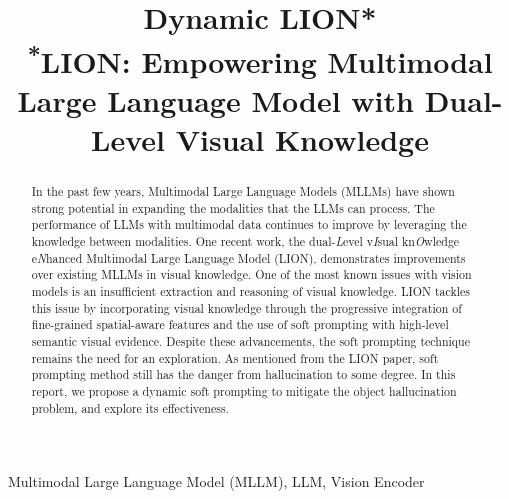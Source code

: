 \documentclass[conference]{IEEEtran}
\begin{document}
\title{Dynamic LION*\\
{\footnotesize \textsuperscript{*}LION: Empowering Multimodal Large Language Model with Dual-Level Visual Knowledge}
}

\author{
  \and
} 

\maketitle

\begin{abstract}
In the past few years, Multimodal Large Language Models (MLLMs) have shown strong potential in expanding the modalities that the LLMs can process.
The performance of LLMs with multimodal data continues to improve by leveraging the knowledge between modalities.
One recent work, the dual-\textit{L}evel v\textit{I}sual kn\textit{O}wledge e\textit{N}hanced Multimodal Large Language Model (LION), demonstrates improvements over existing MLLMs in visual knowledge.
One of the most known issues with vision models is an insufficient extraction and reasoning of visual knowledge.
LION tackles this issue by incorporating visual knowledge through the progressive integration of fine-grained spatial-aware features and the use of soft prompting with high-level semantic visual evidence.
Despite these advancements, the soft prompting technique remains the need for an exploration.
As mentioned from the LION paper, soft prompting method still has the danger from hallucination to some degree.
In this report, we propose a dynamic soft prompting to mitigate the object hallucination problem, and explore its effectiveness.
\end{abstract}

\begin{IEEEkeywords}
Multimodal Large Language Model (MLLM), LLM, Vision Encoder
\end{IEEEkeywords}
\end{document}
